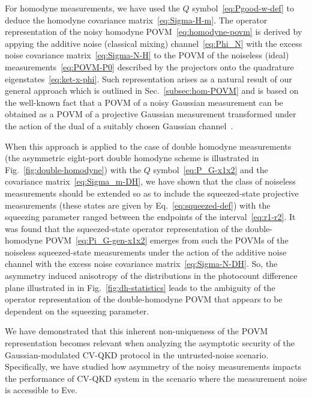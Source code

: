 \documentclass[%
reprint,
superscriptaddress,
 amsmath,amssymb,amsfonts,
 aps,
 pra,
 longbibliography
]{revtex4-2}
\begin{document}
For homodyne measurements,
we have used the $Q$ symbol~\eqref{eq:Pgood-w-def}
to deduce the homodyne covariance matrix~\eqref{eq:Sigma-H-m}.
The operator representation of the noisy homodyne POVM~\eqref{eq:homodyne-povm}
is derived by appying the additive
noise (classical mixing) channel~\eqref{eq:Phi_N}
with the excess noise covariance matrix~\eqref{eq:Sigma-N-H}
to the POVM of
the noiseless (ideal) measurements~\eqref{eq:POVM-P0}
described by the projectors onto the quadrature eigenstates~\eqref{eq:ket-x-phi}.
Such representation arises as a natural result of our general approach
which is outlined in Sec.~\ref{subsec:hom-POVM}
and is based on the well-known fact that
a POVM of a noisy Gaussian measurement
can be obtained as
a POVM of a projective Gaussian measurement
transformed under the action of the dual of a suitably chosen Gaussian channel~\cite{Serafini:bk:2023}. 

When this approach is applied to the case of double
homodyne measurements
(the asymmetric eight-port  double homodyne scheme is illustrated in Fig.~\ref{fig:double-homodyne})
with the $Q$ symbol~\eqref{eq:P_G-x1x2}
and the covariance matrix~\eqref{eq:Sigma_m-DH},
we have shown that
the class of noiseless measurements
should be extended so as to include
the squeezed-state projective measurements
(these states are given by Eq.~\eqref{eq:squeezed-def})
with the squeezing parameter
ranged between the endpoints of the interval~\eqref{eq:r1-r2}.
It was found that
the squeezed-state operator representation  of the double-homodyne POVM~\eqref{eq:Pi_G-gen-x1x2}
emerges from such the POVMs of the noiseless squeezed-state measurements
under the action of
the additive noise channel
with the excess noise covariance matrix~\eqref{eq:Sigma-N-DH}.
So, the asymmetry induced anisotropy of
the distributions in the photocount difference plane illustrated in
in Fig.~\ref{fig:dh-statistics}
leads to the ambiguity of the operator representation of the double-homodyne POVM
that appears to be dependent on the squeezing parameter.

We have demonstrated that
this inherent non-uniqueness of the POVM representation
becomes relevant
when analyzing the asymptotic security
of the Gaussian-modulated CV-QKD protocol
in the untrusted-noise scenario.
Specifically, we have studied
how asymmetry of the noisy measurements
impacts the performance of CV-QKD system in
the scenario where the measurement noise is accessible to Eve.
\end{document}
